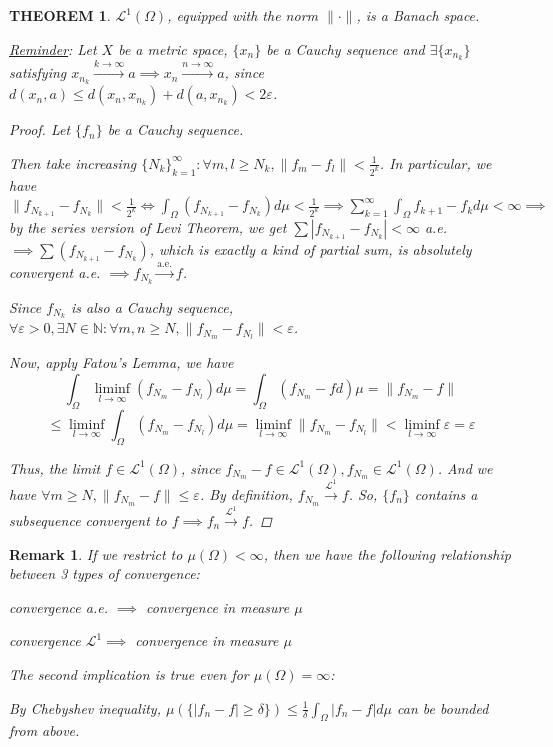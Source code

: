 \documentclass[12pt]{article}
\theoremstyle{blueplain}
\newtheorem{theorem}{THEOREM}[section]
\theoremstyle{bluedef}
\theoremstyle{blueremark}
\newtheorem{remark}{Remark}[section]
\newcommand{\N}{\mathbb{N}}
\newcommand{\eps}{\varepsilon}
\newcommand{\mL}{\mathcal{L}}
\numberwithin{equation}{section}
\begin{document}
\begin{theorem}
  $\mL^1(\Omega)$, equipped with the norm $\|\cdot\|$, is a Banach space.

  \underline{Reminder}: Let $X$ be a metric space, $\{x_n\}$ be a Cauchy sequence and $\exists \{x_{n_k}\}$ satisfying $x_{n_k} \overset{k \to \infty}{\rightarrow} a \implies x_n \overset{n \to \infty}{\rightarrow} a$, since $d(x_n, a) \leq d(x_n, x_{n_k}) + d(a, x_{n_k}) < 2 \eps$.
  \begin{proof}
    Let $\{f_n\}$ be a Cauchy sequence.

    Then take increasing $\{N_k\}_{k=1}^\infty: \forall m,l \geq N_k, \|f_m - f_l\| < \frac{1}{2^k}$. In particular, we have $\|f_{N_{k+1}} - f_{N_k}\| < \frac{1}{2^k} \iff \int_\Omega (f_{N_{k+1}} - f_{N_k}) d\mu < \frac{1}{2^k} \implies \sum_{k=1}^{\infty} \int_\Omega f_{k+1} - f_k d\mu < \infty \implies$  by the series version of Levi Theorem, we get $\sum |f_{N_{k+1}} - f_{N_k}| < \infty$ a.e. $\implies \sum (f_{N_{k+1}} - f_{N_k})$, which is exactly a kind of partial sum, is absolutely convergent a.e. $\implies f_{N_k} \overset{\text{a.e.}}{\rightarrow} f$.

    Since $f_{N_k}$ is also a Cauchy sequence, $\forall \eps>0, \exists N\in \N : \forall m, n\geq N, \|f_{N_m} - f_{N_l}\| < \eps$.

    Now, apply Fatou's Lemma, we have
    $$\int_\Omega \liminf\limits_{l \to \infty} (f_{N_m} - f_{N_l}) d\mu = \int_\Omega (f_{N_m} - f d) \mu = \|f_{N_m} - f\|$$
    $$\leq \liminf\limits_{l \to \infty} \int_\Omega (f_{N_m} - f_{N_l}) d\mu = \liminf\limits_{l \to \infty} \|f_{N_m} - f_{N_l}\| < \liminf\limits_{l \to \infty} \eps = \eps$$

    Thus, the limit $f \in \mL^1(\Omega)$, since $f_{N_m} - f \in \mL^1(\Omega), f_{N_m} \in \mL^1(\Omega)$. And we have $\forall m \geq N, \|f_{N_m} - f\| \leq \eps$. By definition, $f_{N_m} \overset{\mL^1}{\rightarrow} f$. So, $\{f_n\}$ contains a subsequence convergent to $f \implies f_n \overset{\mL^1}{\rightarrow} f$.
  \end{proof}
\end{theorem}

\begin{remark}
  If we restrict to $\mu(\Omega) < \infty$, then we have the following relationship between 3 types of convergence:

  convergence a.e. $\implies$ convergence in measure $\mu$

  convergence $\mL^1 \implies$ convergence in measure $\mu$

  \noindent The second implication is true even for $\mu(\Omega) = \infty$:

  By Chebyshev inequality, $\mu(\{|f_n - f| \geq \delta\}) \leq \frac{1}{\delta} \int_\Omega |f_n - f| d\mu$ can be bounded from above.
\end{remark}
\end{document}

